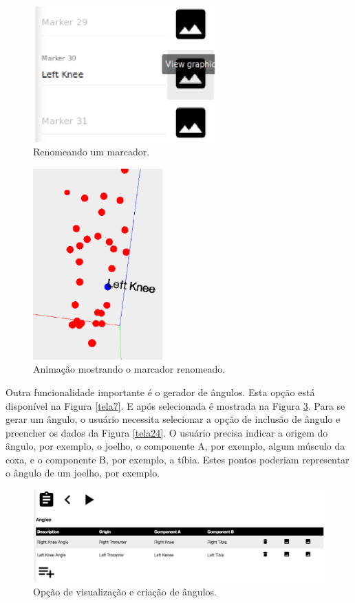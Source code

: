 \begin{figure}[H]
	\centering
	\includegraphics[width=7cm]{figuras/tela21.eps}
	\caption{Renomeando um marcador.}
\label{tela21}
\end{figure}
\begin{figure}[H]
	\centering
	\includegraphics[width=5cm]{figuras/tela22.eps}
	\caption{Animação mostrando o marcador renomeado.}
\label{tela22}

\end{figure}



Outra funcionalidade importante é o gerador de ângulos. Esta opção está disponível na Figura \ref{tela7}. E após selecionada é mostrada na Figura \ref{tela23}. 
Para se gerar um ângulo, o usuário necessita selecionar a opção de inclusão de ângulo e preencher os dados da Figura \ref{tela24}. O usuário precisa indicar a origem do ângulo, por exemplo, o joelho, o componente A, por exemplo, algum músculo da coxa, e o componente B, por exemplo, a tíbia. Estes pontos poderiam representar o ângulo de um joelho, por exemplo.
\begin{figure}[H]
	\centering
	\includegraphics[width=15cm]{figuras/tela23.eps}
	\caption{Opção de visualização e criação de ângulos.}
\label{tela23}
\end{figure}


